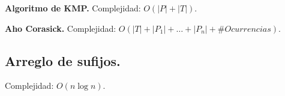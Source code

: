 \documentclass[10pt, letterpaper, twoside]{article}
\begin{document}
\textbf{Algoritmo de KMP.} Complejidad: $O(|P| + |T|)$.



\bigskip

\textbf{Aho Corasick.} Complejidad: $O(|T| + |P_1| + \ldots + |P_n| + \#Ocurrencias)$.



\subsection{Arreglo de sufijos.}

Complejidad: $O(n\log n)$.



\end{document}
